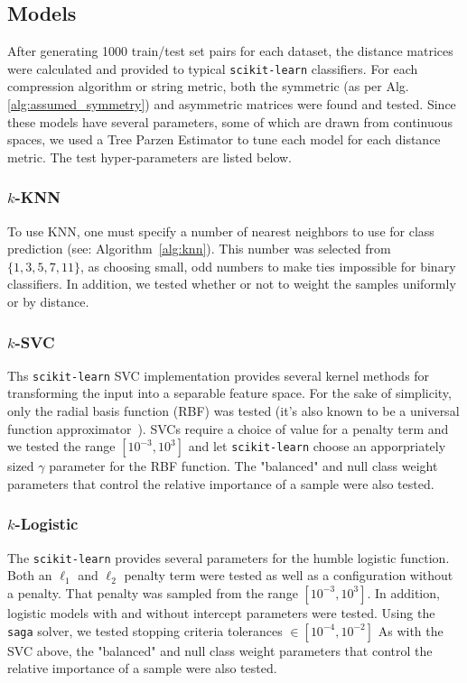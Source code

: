 \documentclass[conference]{IEEEtran}
\begin{document}
\subsection{Models}

After generating 1000 train/test set pairs for each dataset, the distance matrices were calculated and provided to typical \texttt{scikit-learn} classifiers. For each compression algorithm or string metric, both the symmetric (as per  Alg. \ref{alg:assumed_symmetry}) and asymmetric matrices were found and tested. Since these models have several parameters, some of which are drawn from continuous spaces, we used a Tree Parzen Estimator to tune each model for each distance metric. The test hyper-parameters are listed below.

\label{models}
\subsubsection{$k$-KNN}
To use KNN, one must specify a number of nearest neighbors to use for class prediction (see: Algorithm~\ref{alg:knn}). This number was selected from $\{1,3,5,7,11\}$, as choosing small, odd numbers to make ties impossible for binary classifiers. In addition, we tested whether or not to weight the samples uniformly or by distance. 

\subsubsection{$k$-SVC}
Ths \texttt{scikit-learn} SVC implementation provides several kernel methods for transforming the input into a separable feature space. For the sake of simplicity, only the radial basis function (RBF) was tested (it's also known to be a universal function approximator~\cite{}). SVCs require a choice of value for a penalty term and we tested the range $[ 10^{-3}, 10^3]$ and let \texttt{scikit-learn} choose an apporpriately sized $\gamma$ parameter for the RBF function. The "balanced" and null class weight parameters that control the relative importance of a sample were also tested.

\subsubsection{$k$-Logistic}
The \texttt{scikit-learn} provides several parameters for the humble logistic function. Both an $\ell_1$ and $\ell_2$ penalty term were tested as well as a configuration without a penalty. That penalty was sampled from the range $[10^{-3}, 10^3]$. In addition, logistic models with and without intercept parameters were tested. Using the \texttt{saga} solver, we tested stopping criteria tolerances $\in [10^{-4}, 10^{-2}]$
As with the SVC above, the "balanced" and null class weight parameters that control the relative importance of a sample were also tested.
\end{document}
